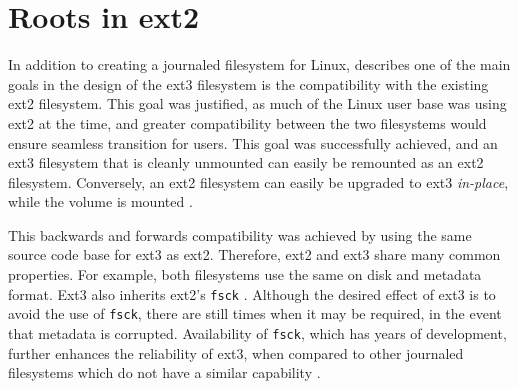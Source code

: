 \section{Roots in ext2}

In addition to creating a journaled filesystem for Linux, \citet{Tweedie2000} describes one of the main goals in the design of the ext3 filesystem is the compatibility with the existing ext2 filesystem. This goal was justified, as much of the Linux user base was using ext2 at the time, and greater compatibility between the two filesystems would ensure seamless transition for users. This goal was successfully achieved, and an ext3 filesystem that is cleanly unmounted can easily be remounted as an ext2 filesystem. Conversely, an ext2 filesystem can easily be upgraded to ext3 \emph{in-place}, while the volume is mounted \citep{Tweedie2000, Robbins2001a, Bovet2006}.

This backwards and forwards compatibility was achieved by using the same source code base for ext3 as ext2. Therefore, ext2 and ext3 share many common properties. For example, both filesystems use the same on disk and metadata format. Ext3 also inherits ext2's \texttt{fsck} \citep{Robbins2001a, Tweedie2000}. Although the desired effect of ext3 is to avoid the use of \texttt{fsck}, there are still times when it may be required, in the event that metadata is corrupted. Availability of \texttt{fsck}, which has years of development, further enhances the reliability of ext3, when compared to other journaled filesystems which do not have a similar capability \citep{Robbins2001a}.